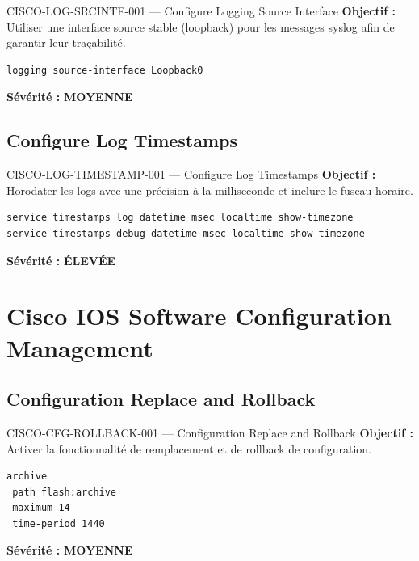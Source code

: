 \documentclass[12pt, a4paper]{report}
\begin{document}
\begin{rulebox}{CISCO-LOG-SRCINTF-001 — Configure Logging Source Interface}
  \textbf{Objectif :} Utiliser une interface source stable (loopback) pour les messages syslog afin de garantir leur traçabilité.

  \begin{lstlisting}
logging source-interface Loopback0
  \end{lstlisting}

  \textbf{Sévérité :} \textcolor{accentGreen}{\textbf{MOYENNE}}
\end{rulebox}

\subsection{Configure Log Timestamps}

\begin{rulebox}{CISCO-LOG-TIMESTAMP-001 — Configure Log Timestamps}
  \textbf{Objectif :} Horodater les logs avec une précision à la milliseconde et inclure le fuseau horaire.

  \begin{lstlisting}
service timestamps log datetime msec localtime show-timezone
service timestamps debug datetime msec localtime show-timezone
  \end{lstlisting}

  \textbf{Sévérité :} \textcolor{accentOrange}{\textbf{ÉLEVÉE}}
\end{rulebox}

\section{Cisco IOS Software Configuration Management}

\subsection{Configuration Replace and Rollback}

\begin{rulebox}{CISCO-CFG-ROLLBACK-001 — Configuration Replace and Rollback}
  \textbf{Objectif :} Activer la fonctionnalité de remplacement et de rollback de configuration.

  \begin{lstlisting}
archive
 path flash:archive
 maximum 14
 time-period 1440
  \end{lstlisting}

  \textbf{Sévérité :} \textcolor{accentGreen}{\textbf{MOYENNE}}
\end{rulebox}
\end{document}
